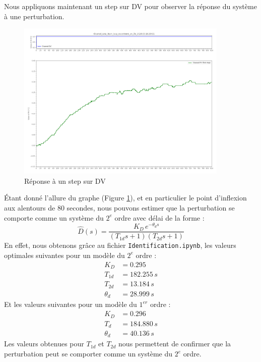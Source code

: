 Nous appliquons maintenant un step sur DV pour observer la réponse du système à une perturbation.
\begin{figure}[H]
    \centering
    \includegraphics[width=0.9\textwidth]{../Plots/Graphical_methods_Cleaned_data_Open_loop_experiment_on_DV_2024-03-18-20h01.png}
    \caption{Réponse à un step sur DV}
    \label{fig:DV_step_response}
\end{figure}

Étant donné l'allure du graphe (Figure \ref{fig:DV_step_response}), et en particulier le point d'inflexion aux alentours de 80 secondes, nous pouvons estimer que la perturbation se comporte comme un système du $2^{e}$ ordre avec délai de la forme :
\begin{equation}
    \hat{D}(s) = \frac{K_D\,e^{-\theta_d s}}{(T_{1d}s + 1)(T_{2d}s + 1)}
\end{equation}
En effet, nous obtenons grâce au fichier \texttt{Identification.ipynb}, les valeurs optimales suivantes pour un modèle du $2^{e}$ ordre :
\begin{align*}
    K_D &= 0.295 \\
    T_{1d} &= 182.255 \,s \\
    T_{2d} &= 13.184 \,s \\
    \theta_d &= 28.999 \,s
\end{align*}
Et les valeurs suivantes pour un modèle du $1^{er}$ ordre :
\begin{align*}
    K_D &= 0.296 \\
    T_{d} &= 184.880 \,s \\
    \theta_d &= 40.136 \,s
\end{align*}
Les valeurs obtenues pour $T_{1d}$ et $T_{2d}$ nous permettent de confirmer que la perturbation peut se comporter comme un système du $2^{e}$ ordre.

